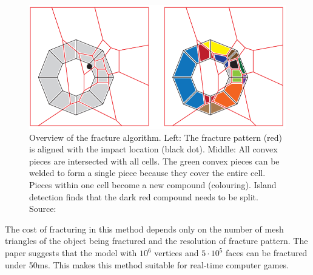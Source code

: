 \begin{figure}
\centering
        \includegraphics[width=\textwidth]{img/vacdAlgorithm}
        \caption{Overview of the fracture algorithm. Left: The fracture pattern (red) is aligned with the impact location (black dot). Middle: All
convex pieces are intersected with all cells. The green convex pieces can be welded to form a single piece because they cover the entire
cell. Pieces within one cell become a new compound (colouring). Island detection finds that the dark red compound needs to be split. Source: \citet{nvidia}}
        \label{fig:vacdalg}
\end{figure}


The cost of fracturing in this method depends only on the number of mesh triangles of the object being fractured and the resolution of fracture pattern. The paper suggests that the model with $10^6$ vertices and $5\cdot10^5$ faces can be fractured under 50ms. This makes this method suitable for real-time computer games.

